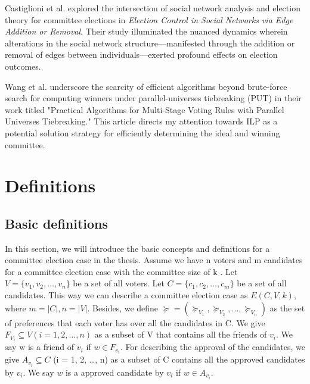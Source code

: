 \documentclass{article}
\begin{document}
Castiglioni et al. \cite{Castiglioni2020} explored the intersection of social network analysis and election theory for committee elections in \textit{Election Control in Social Networks via Edge Addition or Removal}. Their study illuminated the nuanced dynamics wherein alterations in the social network structure—manifested through the addition or removal of edges between individuals—exerted profound effects on election outcomes.

Wang et al. \cite{Wang2019} underscore the scarcity of efficient algorithms beyond brute-force search for computing winners under parallel-universes tiebreaking (PUT) in their work titled "Practical Algorithms for Multi-Stage Voting Rules with Parallel Universes Tiebreaking." This article directs my attention towards ILP as a potential solution strategy for efficiently determining the ideal and winning committee.


\section{Definitions}

\subsection{Basic definitions}
In this section, we will introduce the basic concepts and definitions for a committee election case in the thesis. Assume we have $\mathrm{n}$ voters and $\mathrm{m}$ candidates for a committee election case with the committee size of $\mathrm{k}$ . Let $V = \{ v_1, v_2, \dots , v_n \}$ be a set of all voters. Let $C = \{ c_1, c_2, \dots , c_m \}$ be a set of all candidates. This way we can describe a committee election case as $E(C,V,k)$,  where $m = \vert C \vert, n= \vert V \vert$.  Besides, we define $\succeq = ( \succeq_{V_1}, \succeq_{V_2}, \dots , \succeq_{V_n})$ as the set of preferences that each voter has over all the candidates in $\mathrm{C}$. 
We give $F_{V_i}  \subseteq V (i = 1, 2,  \dots , n)$ as a subset of $\mathrm{V}$ that contains all the friends of $v_i$. We say $\mathrm{w}$ is a friend of $v_i$ if  $w \in F_{v_i}$. For describing the approval of the candidates, we give $A_{v_i}  \subseteq C$ (i = 1, 2,  \dots , n) as a subset of C contains all the approved candidates by $v_i$. We say $w$ is a approved candidate by $v_i$ if $w \in A_{v_i}$.
\end{document}
